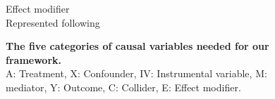 \documentclass[10pt,letterpaper]{article}
\begin{document}
\begin{figure}[h!]
\begin{minipage}[t]{0.4\linewidth}
        \small\sffamily Effect modifier \scriptsize\\Represented
        following \cite{attia2022proposal}
    \end{minipage}
    \caption{\textbf{The five categories of causal variables needed for our framework.}\\ A:
        Treatment, X: Confounder, IV: Instrumental variable, M: mediator, Y:
        Outcome, C: Collider, E: Effect modifier.}\label{fig:causal_variables}
\end{figure}



\end{document}
